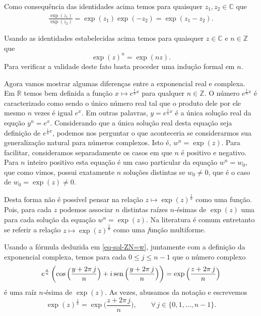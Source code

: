 Como consequência das identidades acima temos para quaisquer $z_1,z_2\in\mathbb{C}$
que 
\begin{align}\label{eq-razao-exps}
\frac{\exp(z_1)}{\exp(z_2)} = \exp(z_1)\exp(-z_2)=\exp(z_1-z_2).
\end{align}


Usando as identidades estabelecidas 
acima temos para quaisquer $z\in\mathbb{C}$ e $n\in\mathbb{Z}$ que 
\[
\exp(z)^n = \exp(nz).
\]
Para verificar a validade deste fato basta proceder uma indução formal em $n$.

\bigskip 

Agora vamos mostrar algumas diferenças entre a exponencial real e complexa. 
Em $\mathbb{R}$ temos bem definida a função $x\longmapsto e^{\frac{1}{n}x}$
para qualquer $n\in\mathbb{Z}$. O número $e^{\frac{1}{n}x}$ é caracterizado 
como sendo o único número real tal que o produto dele por ele mesmo $n$ vezes é
igual $e^x$. Em outras palavras, $y=e^{\frac{1}{n}x}$ é a única solução real 
da equção $y^n=e^x$. Considerando que a única solução real 
desta equação seja definição de $e^{\frac{1}{n}x}$, podemos nos perguntar o 
que aconteceria se considerarmos sua generalização natural para números complexos.
Isto é, $w^n=\exp(z)$. Para facilitar, consideramos separadamente os casos 
em que $n$ é positivo e negativo. Para $n$ inteiro positivo  
esta equação é um caso particular da equação $w^n=w_0$,
que como vimos, possui exatamente $n$ soluções distintas se $w_0\neq 0$, 
que é o caso de $w_0=\exp(z)\neq 0$. 

Desta forma não é possível pensar na relação $z\longmapsto \exp(z)^{\frac{1}{n}}$
como uma função. Pois, para cada $z$ podemos associar $n$ distintas 
raízes $n$-ésimas de $\exp(z)$ uma para cada solução da equação $w^n = \exp(z)$. 
Na literatura é comum entretanto se referir a relação $z\longmapsto \exp(z)^{\frac{1}{n}}$
como uma {\textit função multiforme}. 

Usando a fórmula deduzida em \eqref{eq-sol-ZN=w}, juntamente com a definição 
da exponencial complexa, temos para cada 
$0\leqslant j\leqslant n-1$ que o número complexo
\begin{align*}
e^{\frac{x}{n}} 
	\left( 
		\cos\Big( \frac{y+2\pi\, j}{n} \Big)  
		+i
		\operatorname{sen}\Big( \frac{y+2\pi\, j}{n} \Big)  
	\right)
=
\exp\Big( \frac{z+2\pi\, j}{n}  \Big)
\end{align*}
é uma raíz $n$-ésima de $\exp(z)$. As vezes, abusamos da notação 
e escrevemos 
\[
\exp(z)^{\frac{1}{n}} = \exp\Big( \frac{z+2\pi\, j}{n}  \Big),
\qquad \forall\, j\in\{0,1,\ldots,n-1\}.
\]

